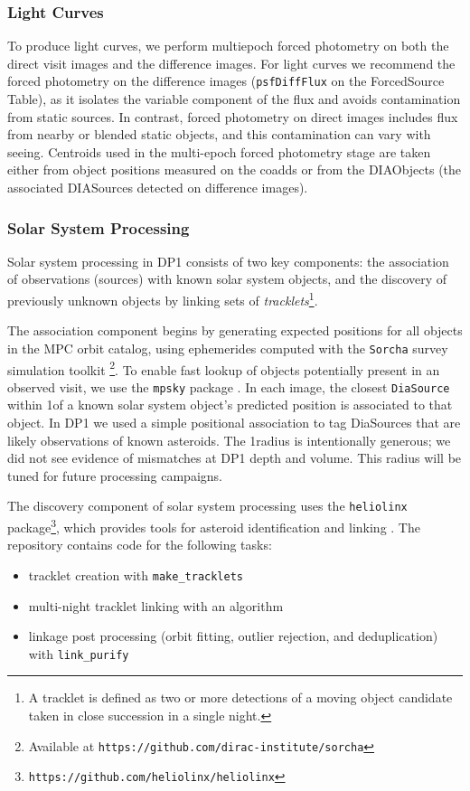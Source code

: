 \subsubsection{Light Curves}
\label{sssec:lightcurves}
To produce light curves, we perform multiepoch \gls{forced photometry} on both the direct visit images and the difference images.
For light curves we recommend the \gls{forced photometry} on the difference images (\texttt{psfDiffFlux} on the ForcedSource Table), as it isolates the variable component of the flux and avoids contamination from static sources.
In contrast, \gls{forced photometry} on direct images includes flux from nearby or blended static objects, and this contamination can vary with seeing.
Centroids used in the multi-epoch \gls{forced photometry} stage are taken either from object positions measured on the coadds or from the DIAObjects (the associated DIASources detected on difference images).

\subsubsection{Solar System Processing}
\label{sec:drp:solsys}

Solar system processing in \gls{DP1} consists of two key components: the association of observations (sources) with known solar system objects, and the discovery of previously unknown objects by linking sets of
{\em tracklets}\footnote{A tracklet is defined as two or more detections of a moving object candidate taken in close succession in a single night.}.

The association component begins by generating expected positions for all objects in the \gls{MPC} orbit catalog, using ephemerides computed with the \texttt{Sorcha} survey simulation toolkit \citep[][]{2025AJ....170..100M2} \footnote{Available at \nolinkurl{https://github.com/dirac-institute/sorcha}}.
To enable fast lookup of objects potentially present in an observed visit, we use the \texttt{mpsky} package \citep[][]{mpsky}.
In each image, the closest \texttt{DiaSource} within 1\farcs of a known solar system object's predicted position is associated to that object.
In \gls{DP1} we used a simple positional association to tag DiaSources that are likely observations of known asteroids.
The 1\farcs radius is intentionally generous;  we did not see evidence of mismatches at DP1 depth and volume.
This radius will be tuned for future processing campaigns.

The discovery component of solar system processing uses the \texttt{heliolinx} package\footnote{\nolinkurl{https://github.com/heliolinx/heliolinx}}, which provides tools for asteroid identification and linking \citep[][]{heliolinx}.
The repository contains code for the following tasks:
\begin{itemize}
    \item tracklet creation with \texttt{make\_tracklets}
    \item multi-night \gls{tracklet} linking with an algorithm
    \item linkage post processing (orbit fitting, outlier rejection, and deduplication) with \texttt{link\_purify}
\end{itemize}

